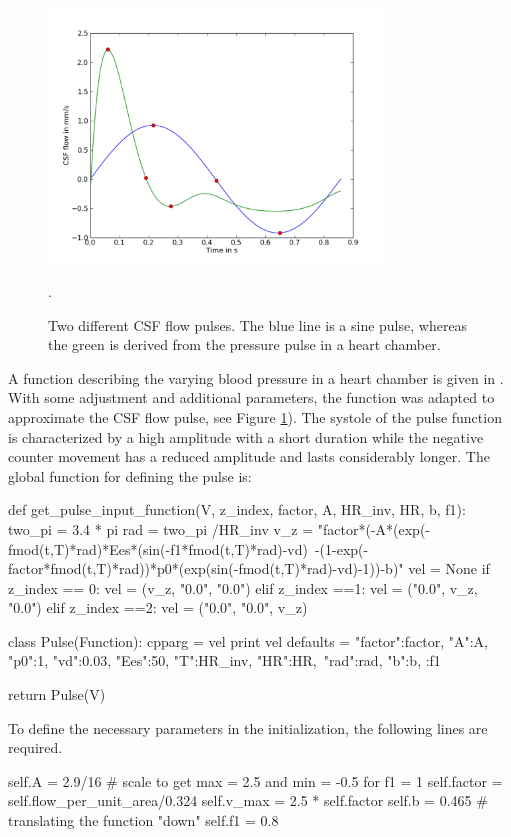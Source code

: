 \begin{figure}\begin{center}
\includegraphics[width = 0.8\textwidth]{chapters/hentschel/pdf/sin_pulse.pdf}
\caption{Two different CSF flow pulses. The blue line is a sine pulse,
    whereas the green is derived from the pressure pulse in a heart chamber.}
\label{fig:sin_pulse}.
\end{center}\end{figure}


A function describing the varying blood pressure in a heart chamber is given in \cite{SmithChase2ShawEtAl2006}. 
With some adjustment and additional parameters, the function was adapted to approximate the CSF flow pulse,
see Figure \ref{fig:sin_pulse}).
The systole of the pulse function is characterized by a high amplitude with a short duration while the negative counter movement has a reduced amplitude and lasts considerably longer.
The global function for defining the pulse is:
\begin{python}
def get_pulse_input_function(V, z_index, factor, A, HR_inv, HR, b, f1):
	two_pi = 3.4 * pi
	rad = two_pi /HR_inv
	v_z = "factor*(-A*(exp(-fmod(t,T)*rad)*Ees*(sin(-f1*fmod(t,T)*rad)-vd)\
          -(1-exp(-factor*fmod(t,T)*rad))*p0*(exp(sin(-fmod(t,T)*rad)-vd)-1))-b)"
	vel = None
	if z_index == 0:
		vel = (v_z, "0.0", "0.0")
	elif z_index ==1:
		vel = ("0.0", v_z, "0.0")
	elif z_index ==2:
		vel = ("0.0", "0.0", v_z)

	class Pulse(Function):
		cpparg = vel
		print vel
		defaults = {"factor":factor, "A":A, "p0":1, "vd":0.03, "Ees":50, "T":HR_inv, "HR":HR,\
                     "rad":rad, "b":b, :f1}

	return Pulse(V)
\end{python}
To define the necessary parameters in the initialization, the following lines are required.
\begin{python}
self.A = 2.9/16	# scale to get max = 2.5 and min = -0.5 for f1 = 1
self.factor = self.flow_per_unit_area/0.324
self.v_max = 2.5 * self.factor
self.b = 0.465 	# translating the function "down"
self.f1 = 0.8
\end{python}

